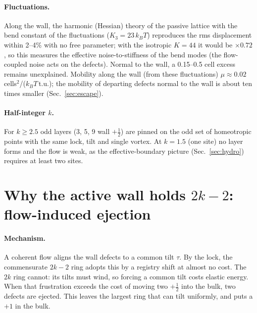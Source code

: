 \documentclass[11pt,a4paper]{article}
\newcommand{\half}{\tfrac12}
\newcommand{\kT}{k_BT}
\begin{document}
\paragraph{Fluctuations.} Along the wall, the harmonic (Hessian) theory of the passive lattice with the bend constant of the fluctuations ($K_3=23\,\kT$) reproduces the rms displacement within 2--4\%
with no free parameter; with the isotropic $K=44$ it would be $\times0.72$, so this measures the effective noise-to-stiffness of the bend modes (the flow-coupled noise acts on the defects). Normal to the wall, a 0.15--0.5 cell excess remains unexplained. Mobility along the wall (from these fluctuations) $\mu\approx0.02$\,cells$^2$/($\kT$\,t.u.); the mobility of departing defects normal to the wall is about ten times smaller (Sec.~\ref{sec:escape}).

\paragraph{Half-integer $k$.} For $k\ge2.5$ odd layers (3, 5, 9 wall $+\half$) are pinned on the odd set of homeotropic points with the same lock, tilt and single
vortex. At $k=1.5$ (one site) no layer forms and the flow is weak, as the effective-boundary picture (Sec.~\ref{sec:hydro}) requires at least two sites.

\section{Why the active wall holds $2k-2$: flow-induced ejection}\label{sec:ejection}
\paragraph{Mechanism.} A coherent flow aligns the wall defects to a common tilt $\tau$. By the lock, the commensurate $2k-2$ ring adopts this by a registry shift at
almost no cost. The $2k$ ring cannot: its tilts must wind, so forcing a common tilt costs elastic energy. When that frustration exceeds the cost of moving two
$+\half$ into the bulk, two defects are ejected. This leaves the largest ring that can tilt uniformly, and puts a $+1$ in the bulk.
\end{document}
